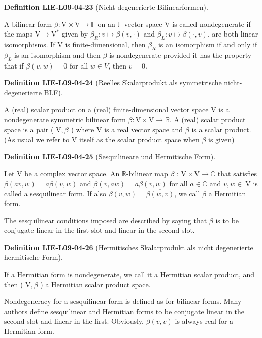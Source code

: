 \documentclass[10pt, letterpaper]{article}
\newcommand{\CustomHeading}[3]{%
  \par\medskip\noindent%
  \textbf{#1 #2} \textnormal{(#3)}.\enskip%
}
\newenvironment{DEF}[2]{\CustomHeading{Definition}{#1}{#2}}{}
\begin{document}
\begin{DEF}{LIE-L09-04-23}{Nicht degenerierte Bilinearformen}
A bilinear form $\beta: \mathrm{V} \times \mathrm{V} \rightarrow \mathbb{F}$ on an $\mathbb{F}$-vector space V is called nondegenerate if the maps $\mathrm{V} \rightarrow \mathrm{V}^{*}$ given by $\beta_{R}: v \mapsto \beta(v, \cdot)$ and $\beta_{L}: v \mapsto \beta(\cdot, v)$, are both linear isomorphisms. If V is finite-dimensional, then $\beta_{R}$ is an isomorphism if and only if $\beta_{L}$ is an isomorphism and then $\beta$ is nondegenerate provided it has the property that if $\beta(v, w)=0$ for all $w \in V$, then $v=0$.
\end{DEF}

\begin{DEF}{LIE-L09-04-24}{Reelles Skalarprodukt als symmetrische nicht-degenerierte BLF}
A (real) scalar product on a (real) finite-dimensional vector space V is a nondegenerate symmetric bilinear form $\beta: \mathrm{V} \times \mathrm{V} \rightarrow \mathbb{R}$. A (real) scalar product space is a pair ( $\mathrm{V}, \beta$ ) where V is a real vector space and $\beta$ is a scalar product. (As usual we refer to V itself as the scalar product space when $\beta$ is given)
\end{DEF}

\begin{DEF}{LIE-L09-04-25}{Sesquilineare und Hermitische Form}
Let V be a complex vector space. An $\mathbb{R}$-bilinear map $\beta$ : $\mathrm{V} \times \mathrm{V} \rightarrow \mathbb{C}$ that satisfies $\beta(a v, w)=\bar{a} \beta(v, w)$ and $\beta(v, a w)=a \beta(v, w)$ for all $a \in \mathbb{C}$ and $v, w \in \mathrm{~V}$ is called a sesquilinear form. If also $\beta(v, w)=\overline{\beta(w, v)}$, we call $\beta$ a Hermitian form.

The sesquilinear conditions imposed are described by saying that $\beta$ is to be conjugate linear in the first slot and linear in the second slot.
\end{DEF}

\begin{DEF}{LIE-L09-04-26}{Hermitisches Skalarprodukt als nicht degenerierte hermitische Form}
If a Hermitian form is nondegenerate, we call it a Hermitian scalar product, and then ( $\mathrm{V}, \beta$ ) a Hermitian scalar product space.

Nondegeneracy for a sesquilinear form is defined as for bilinear forms. Many authors define sesquilinear and Hermitian forms to be conjugate linear in the second slot and linear in the first. Obviously, $\beta(v, v)$ is always real for a Hermitian form.
\end{DEF}
\end{document}
